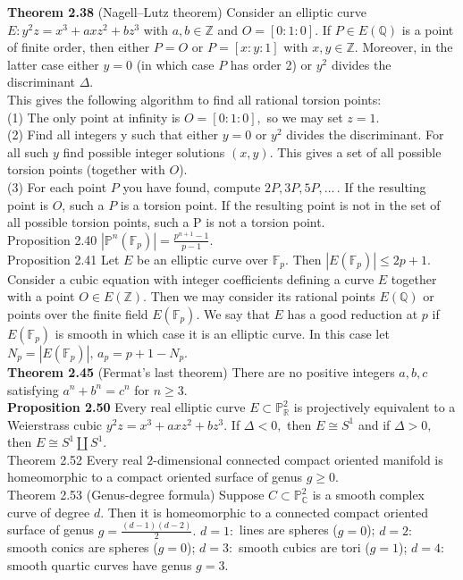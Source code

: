 \documentclass[8pt]{extarticle}
\begin{document}
\textbf{Theorem 2.38} (Nagell–Lutz theorem) Consider an elliptic curve $E: y^2z = x^3 + axz^2 + bz^3$
with $a,b\in \mathbb{Z}$ and $O = [0 : 1 : 0].$ If $P \in E(\mathbb{Q})$ is a point of finite order, then either $P = O$ or $P = [x : y : 1]$ with $x,y \in \mathbb{Z}.$ Moreover, in the latter case either $y = 0$ (in which case $P$ has order 2) or $y^2$ divides the discriminant $\Delta.$\\
This gives the following algorithm to find all rational torsion points:\\
(1) The only point at infinity is $O=[0:1:0],$ so we may set $z=1.$\\
(2) Find all integers y such that either $y = 0$ or $y^2$ divides the discriminant. For all such $y$ find possible integer solutions $(x,y).$ This gives a set of all possible torsion points (together with $O$).\\
(3) For each point $P$ you have found, compute $2P, 3P, 5P,...\,.$ If the resulting point is $O$, such a $P$ is a torsion point. If the resulting point is not in the set of all possible torsion points, such a P is not a torsion point.\\
Proposition 2.40 $|\mathbb{P}^n(\mathbb{F}_p)|=\frac{p^{n+1}-1}{p-1}.$\\
Proposition 2.41 Let $E$ be an elliptic curve over $\mathbb{F}_p.$ Then $|E(\mathbb{F}_p)|\leq 2p + 1.$\\
Consider a cubic equation with integer coefficients defining a curve $E$ together with a point $O \in E(\mathbb{Z}).$ Then we may consider its rational points $E(\mathbb{Q})$ or points over the finite field $E(\mathbb{F}_p).$ We say that $E$ has a good reduction at $p$ if $E(\mathbb{F}_p)$ is smooth in which case it is an elliptic curve. In this case let $N_p =|E(\mathbb{F}_p)|,\,a_p =p+1-N_p.$\\
\textbf{Theorem 2.45} (Fermat’s last theorem) There are no positive integers $a, b, c$ satisfying $a^n + b^n = c^n$ for $n \ge 3.$\\
\textbf{Proposition 2.50} Every real elliptic curve $E \subset \mathbb{P}^2_\mathbb{R}$ is projectively equivalent to a Weierstrass cubic $y^2z = x^3 + axz^2 + bz^3.$ If $\Delta<0,$ then $E\cong S^1$ and if $\Delta>0,$ then $E\cong S^1\coprod S^1.$\\
Theorem 2.52 Every real $2$-dimensional connected compact oriented manifold is homeomorphic to a compact oriented surface of genus $g \ge 0.$\\
Theorem 2.53 (Genus-degree formula) Suppose $C \subset \mathbb{P}^2_\mathbb{C}$ is a smooth complex curve of degree $d.$ Then it is homeomorphic to a connected compact oriented surface of genus $g = \frac{(d-1)(d-2)}{2}.$ $d=1:$ lines are spheres ($g=0$); $d=2:$ smooth conics are spheres ($g=0$); $d=3:$ smooth cubics are tori ($g=1$); $d=4:$ smooth quartic curves have genus $g=3.$\\
\end{document}
